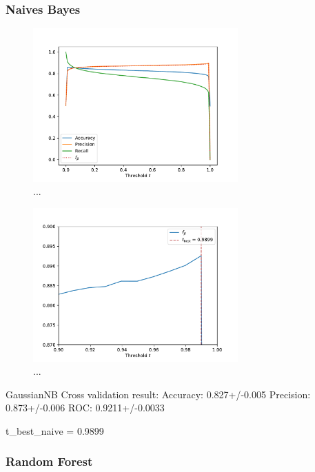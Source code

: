 \subsubsection{Naives Bayes}
\begin{figure}
    \centering
    \includegraphics[width=0.7\textwidth]{content/plots/apr_naive.pdf}
    \caption{...}
    \label{fig:apr_naive}
\end{figure}

\begin{figure}
    \centering
    \includegraphics[width=0.7\textwidth]{content/plots/f_beta_naive.pdf}
    \caption{...}
    \label{fig:f_beta_naive}
\end{figure}

GaussianNB Cross validation result:
Accuracy: 0.827+/-0.005
Precision: 0.873+/-0.006
ROC: 0.9211+/-0.0033

t_best_naive = 0.9899

\subsubsection{Random Forest}

